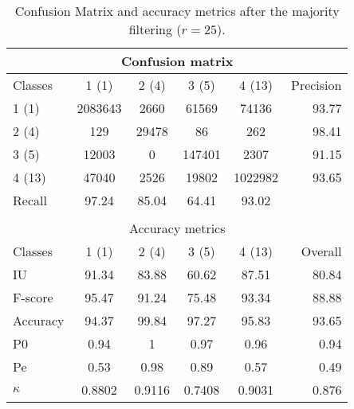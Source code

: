 \begin{table}[H]
\begin{center}
\footnotesize
\begin{tabular}{|l|c|c|c|c|r|}
\hline
\multicolumn{6}{|c|}{Confusion matrix} \\
\hline
 Classes & 1 (1) & 2 (4) & 3 (5) & 4 (13) & Precision \\
\hline
1 (1) & 2083643 & 2660 & 61569 & 74136 & 93.77 \\
\hline
2 (4) & 129 & 29478 & 86 & 262 & 98.41 \\
\hline
3 (5) & 12003 & 0 & 147401 & 2307 & 91.15 \\
\hline
4 (13) & 47040 & 2526 & 19802 & 1022982 & 93.65 \\
\hline
Recall & 97.24 & 85.04 & 64.41 & 93.02 &  \\
\hline
\multicolumn{6}{c}{ } \\
\hline
\multicolumn{6}{|c|}{Accuracy metrics} \\
\hline
 Classes & 1 (1) & 2 (4) & 3 (5) & 4 (13) & Overall \\
\hline
IU & 91.34 & 83.88 & 60.62 & 87.51 & 80.84 \\
\hline
F-score & 95.47 & 91.24 & 75.48 & 93.34 & 88.88 \\
\hline
Accuracy & 94.37 & 99.84 & 97.27 & 95.83 & 93.65 \\
\hline
P0 & 0.94 & 1 & 0.97 & 0.96 & 0.94 \\
\hline
Pe & 0.53 & 0.98 & 0.89 & 0.57 & 0.49 \\
\hline
$\kappa$ & 0.8802 & 0.9116 & 0.7408 & 0.9031 & 0.876 \\
\hline
\end{tabular}
\caption{Confusion Matrix and accuracy metrics after the majority filtering ($r=25$).}
\label{table:}
\end{center}
\end{table}
